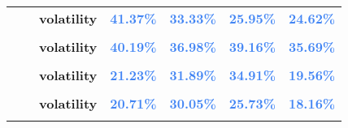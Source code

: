 \documentclass[
  authoryear,
  preprint,
  3p]{elsarticle}
\begin{document}
\begin{longtable}[t]{>{}l>{}l>{}l>{}r>{}r>{}r>{}r}
\textbf{} & \textbf{} & \textbf{volatility} & \textcolor[HTML]{4285f4}{\textbf{41.37\%}} & \textcolor[HTML]{4285f4}{\textbf{33.33\%}} & \textcolor[HTML]{4285f4}{\textbf{25.95\%}} & \textcolor[HTML]{4285f4}{\textbf{24.62\%}}\\
\textbf{\cellcolor{gray!10}{}} & \textbf{\cellcolor{gray!10}{contango}} & \textbf{\cellcolor{gray!10}{mean}} & \textcolor[HTML]{4285f4}{\textbf{\cellcolor{gray!10}{-2.74\%}}} & \textcolor[HTML]{4285f4}{\textbf{\cellcolor{gray!10}{30.5\%}}} & \textcolor[HTML]{4285f4}{\textbf{\cellcolor{gray!10}{-10.77\%}}} & \textcolor[HTML]{4285f4}{\textbf{\cellcolor{gray!10}{-21.62\%}}}\\
\textbf{} & \textbf{} & \textbf{volatility} & \textcolor[HTML]{4285f4}{\textbf{40.19\%}} & \textcolor[HTML]{4285f4}{\textbf{36.98\%}} & \textcolor[HTML]{4285f4}{\textbf{39.16\%}} & \textcolor[HTML]{4285f4}{\textbf{35.69\%}}\\
\textbf{\cellcolor{gray!10}{Copper (XCEC)}} & \textbf{\cellcolor{gray!10}{whole period}} & \textbf{\cellcolor{gray!10}{mean}} & \textcolor[HTML]{4285f4}{\textbf{\cellcolor{gray!10}{1.45\%}}} & \textcolor[HTML]{4285f4}{\textbf{\cellcolor{gray!10}{*28.15\%}}} & \textcolor[HTML]{4285f4}{\textbf{\cellcolor{gray!10}{6.19\%}}} & \textcolor[HTML]{4285f4}{\textbf{\cellcolor{gray!10}{-0.1\%}}}\\
\addlinespace
\textbf{} & \textbf{} & \textbf{volatility} & \textcolor[HTML]{4285f4}{\textbf{21.23\%}} & \textcolor[HTML]{4285f4}{\textbf{31.89\%}} & \textcolor[HTML]{4285f4}{\textbf{34.91\%}} & \textcolor[HTML]{4285f4}{\textbf{19.56\%}}\\
\textbf{\cellcolor{gray!10}{}} & \textbf{\cellcolor{gray!10}{backwardation}} & \textbf{\cellcolor{gray!10}{mean}} & \textcolor[HTML]{4285f4}{\textbf{\cellcolor{gray!10}{3.14\%}}} & \textcolor[HTML]{4285f4}{\textbf{\cellcolor{gray!10}{22.17\%}}} & \textcolor[HTML]{4285f4}{\textbf{\cellcolor{gray!10}{16.53\%}}} & \textcolor[HTML]{4285f4}{\textbf{\cellcolor{gray!10}{12.1\%}}}\\
\textbf{} & \textbf{} & \textbf{volatility} & \textcolor[HTML]{4285f4}{\textbf{20.71\%}} & \textcolor[HTML]{4285f4}{\textbf{30.05\%}} & \textcolor[HTML]{4285f4}{\textbf{25.73\%}} & \textcolor[HTML]{4285f4}{\textbf{18.16\%}}\\
\textbf{\cellcolor{gray!10}{}} & \textbf{\cellcolor{gray!10}{contango}} & \textbf{\cellcolor{gray!10}{mean}} & \textcolor[HTML]{4285f4}{\textbf{\cellcolor{gray!10}{-0.28\%}}} & \textcolor[HTML]{4285f4}{\textbf{\cellcolor{gray!10}{34.17\%}}} & \textcolor[HTML]{4285f4}{\textbf{\cellcolor{gray!10}{-3.46\%}}} & \textcolor[HTML]{4285f4}{\textbf{\cellcolor{gray!10}{-12.15\%}}}\\

\end{longtable}
\end{document}
